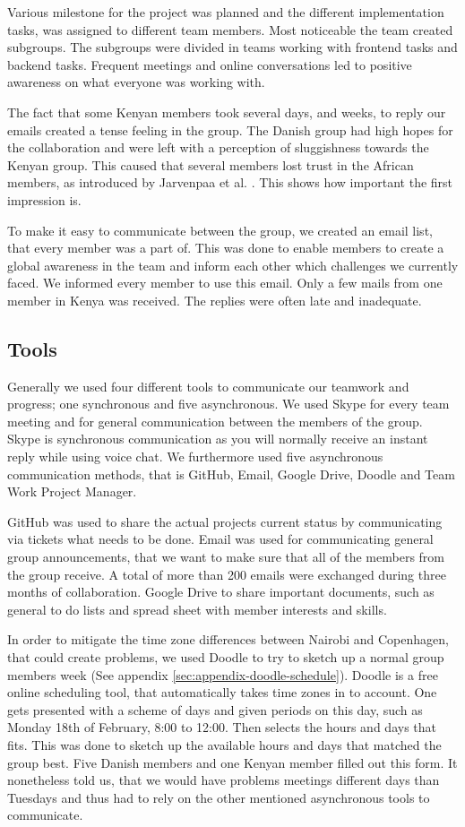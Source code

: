 Various milestone for the project was planned and the different implementation tasks, was assigned to different team members. Most noticeable the team created subgroups. The subgroups were divided in teams working with frontend tasks and backend tasks. Frequent meetings and online conversations led to positive awareness \cite{leinonen2005conceptualizing} on what everyone was working with.

The fact that some Kenyan members took several days, and weeks, to reply our emails created a tense feeling in the group. The Danish group had high hopes for the collaboration and were left with a perception of sluggishness towards the Kenyan group. This caused that several members lost trust in the African members, as introduced by Jarvenpaa et al. \cite{jarvenpaa1998communication}. This shows how important the first impression is.

To make it easy to communicate between the group, we created an email list, that every member was a part of. This was done to enable members to create a global awareness in the team and inform each other which challenges we currently faced. We informed every member to use this email. Only a few mails from one member in Kenya was received. The replies were often late and inadequate.

\subsection{Tools} \label{sec:tools}
Generally we used four different tools to communicate our teamwork and progress; one synchronous and five asynchronous. We used Skype for every team meeting and for general communication between the members of the group. Skype is synchronous communication as you will normally receive an instant reply while using voice chat. We furthermore used five asynchronous communication methods, that is GitHub, Email, Google Drive, Doodle and Team Work Project Manager. 

GitHub was used to share the actual projects current status by communicating via tickets what needs to be done. Email was used for communicating general group announcements, that we want to make sure that all of the members from the group receive. A total of more than 200 emails were exchanged during three months of collaboration. 
Google Drive to share important documents, such as general to do lists and spread sheet with member interests and skills. 

In order to mitigate the time zone differences between Nairobi and Copenhagen, that could create problems, we used Doodle to try to sketch up a normal group members week (See appendix \ref{sec:appendix-doodle-schedule}). Doodle is a free online scheduling tool, that automatically takes time zones in to account. One gets presented with a scheme of days and given periods on this day, such as Monday 18th of February, 8:00 to 12:00. Then selects the hours and days that fits. This was done to sketch up the available hours and days that matched the group best. Five Danish members and one Kenyan member filled out this form. It nonetheless told us, that we would have problems meetings different days than Tuesdays and thus had to rely on the other mentioned asynchronous tools to communicate. 

